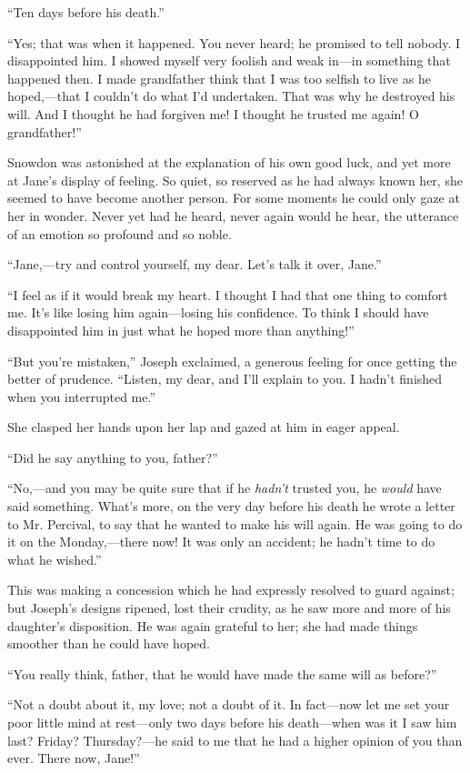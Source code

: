 ``Ten days before his death.''

``Yes; that was when it happened. You never heard; he promised to tell
nobody. I disappointed him. I showed myself very foolish and weak
in---in something that happened then. I made grandfather think that I
was too selfish to live as he hoped,---that I couldn't do what I'd
undertaken. That was why he destroyed his will. And I thought he had
forgiven me! I thought he trusted me again! O grandfather!''

Snowdon was astonished at the explanation of his own good luck, and yet
more at Jane's display of feeling. So quiet, so reserved as he had
always known her, she seemed to have become another person. For some
moments he could only gaze at her in wonder. Never yet had he heard,
never again would he hear, {}the utterance of an emotion so profound and
so noble.

``Jane,---try and control yourself, my dear. Let's talk it over, Jane.''

``I feel as if it would break my heart. I thought I had that one thing
to comfort me. It's like losing him again---losing his confidence. To
think I should have disappointed him in just what he hoped more than
anything!''

``But you're mistaken,'' Joseph exclaimed, a generous feeling for once
getting the better of prudence. ``Listen, my dear, and I'll explain to
you. I hadn't finished when you interrupted me.''

She clasped her hands upon her lap and gazed at him in eager appeal.

``Did he say anything to you, father?''

``No,---and you may be quite sure that if he \emph{hadn't} trusted you,
he \emph{would} have said something. What's more, on the very day before
his death he wrote a letter to Mr. Percival, to say that he wanted to
make his will again. He was going to do it on the Monday,---there now!
It was only an accident; he hadn't time to do what he wished.''

{}This was making a concession which he had expressly resolved to guard
against; but Joseph's designs ripened, lost their crudity, as he saw
more and more of his daughter's disposition. He was again grateful to
her; she had made things smoother than he could have hoped.

``You really think, father, that he would have made the same will as
before?''

``Not a doubt about it, my love; not a doubt of it. In fact---now let me
set your poor little mind at rest---only two days before his
death---when was it I saw him last? Friday? Thursday?---he said to me
that he had a higher opinion of you than ever. There now, Jane!''

